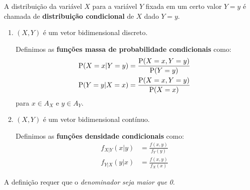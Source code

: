 \begin{example}
    \begin{center}
    \end{center}
\end{example}

A distribuição da variável $X$ para a variável $Y$ fixada
em um certo valor $Y = y$ é chamada de
\textbf{distribuição condicional} de $X$ dado $Y = y$.

\begin{definition}
    \begin{enumerate}
        \item $(X, Y)$ é um vetor bidimensional discreto.
        
        Definimos as \textbf{funções massa de probabilidade condicionais}
        como:
        \begin{align}
            \operatorname{P}(X = x | Y = y) &= \frac{\operatorname{P}(X = x , Y = y)}{\operatorname{P}(Y = y)}
                \label{eq:ch03-cond-x-discreta} \\
            \operatorname{P}(Y = y | X = x) &= \frac{\operatorname{P}(X = x , Y = y)}{\operatorname{P}(X = x)}
                \label{eq:ch03-cond-y-discreta}
        \end{align}
        para $x \in A_X$ e $y \in A_Y$.

        \item $(X, Y)$ é um vetor bidimensional contínuo.

        Definimos as \textbf{funções densidade condicionais}
        como:
        \begin{align}
            f_{X|Y}(x | y) &= \frac{f(x, y)}{f_Y(y)}
                \label{eq:ch03-cond-x-contínua} \\
            f_{Y|X}(y | x) &= \frac{f(x, y)}{f_X(x)}
                \label{eq:ch03-cond-y-contínua}
        \end{align}
    \end{enumerate}

    \begin{obs}
        A definição requer que o \textit{denominador seja maior que 0}.
    \end{obs}
\end{definition}

